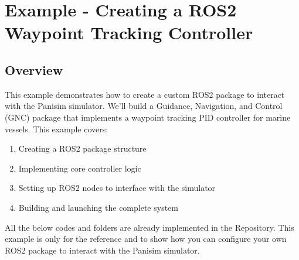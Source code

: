 \documentclass[
  letterpaper,
  DIV=11,
  numbers=noendperiod]{scrreprt}
\providecommand{\tightlist}{%
  \setlength{\itemsep}{0pt}\setlength{\parskip}{0pt}}\usepackage{longtable,booktabs,array}
\begin{document}

\chapter*{Example - Creating a ROS2 Waypoint Tracking
Controller}\label{example---creating-a-ros2-waypoint-tracking-controller}


\section*{Overview}\label{overview-8}


This example demonstrates how to create a custom ROS2 package to
interact with the Panisim simulator. We'll build a Guidance, Navigation,
and Control (GNC) package that implements a waypoint tracking PID
controller for marine vessels. This example covers:

\begin{enumerate}
\def\labelenumi{\arabic{enumi}.}
\tightlist
\item
  Creating a ROS2 package structure
\item
  Implementing core controller logic
\item
  Setting up ROS2 nodes to interface with the simulator
\item
  Building and launching the complete system
\end{enumerate}

\begin{tcolorbox}[enhanced jigsaw, colback=white, toptitle=1mm, colframe=quarto-callout-tip-color-frame, rightrule=.15mm, breakable, title=\textcolor{quarto-callout-tip-color}{\faLightbulb}\hspace{0.5em}{Tip}, toprule=.15mm, opacitybacktitle=0.6, opacityback=0, coltitle=black, leftrule=.75mm, colbacktitle=quarto-callout-tip-color!10!white, arc=.35mm, titlerule=0mm, bottomtitle=1mm, bottomrule=.15mm, left=2mm]

All the below codes and folders are already implemented in the
Repository. This example is only for the reference and to show how you
can configure your own ROS2 package to interact with the Panisim
simulator.

\end{tcolorbox}
\end{document}
